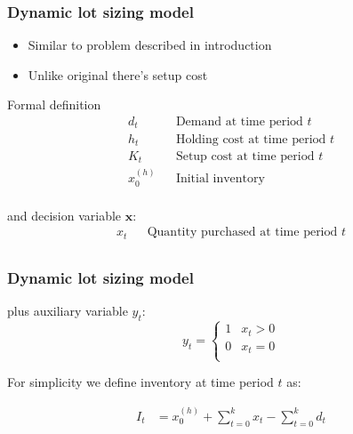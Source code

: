 \documentclass{beamer}
\begin{document}
\begin{frame}
    \frametitle{Dynamic lot sizing model}
    \begin{itemize}
        \item Similar to problem described in introduction
        \item Unlike original there's setup cost
    \end{itemize}

    \begin{block}{Formal definition}
        \begin{align*}
          d_t && \text{Demand at time period $t$} \\
          h_t && \text{Holding cost at time period $t$} \\
          K_t && \text{Setup cost at time period $t$} \\
          x^{(h)}_0 && \text{Initial inventory} \\
        \end{align*}

        and decision variable $\mathbf{x}$:
        \begin{align*}
                  x_t && \text{Quantity purchased at time period $t$}\\
        \end{align*}
    \end{block}
\end{frame}

\begin{frame}
    \frametitle{Dynamic lot sizing model}
    \begin{block}{}
        plus auxiliary variable $y_t$:
        \begin{equation*}
            y_t = \begin{cases}
                1 & x_t > 0\\
                0 & x_t = 0 \\
            \end{cases}
        \end{equation*}

        For simplicity we define inventory at time period $t$ as:

        \begin{align*}
          I_t &= x^{(h)}_0 + \sum_{t=0}^k{x_t} - \sum_{t=0}^k{d_t}\\
        \end{align*}

    \end{block}
\end{frame}
\end{document}
